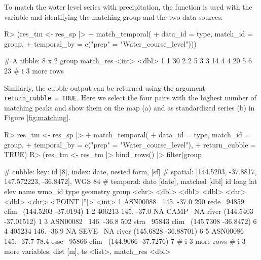 \documentclass[
  shortnames]{jss}
\begin{document}
To match the water level series with precipitation, the function  is used with the variable  and  identifying the matching group and the two data sources:

\begin{CodeChunk}
\begin{CodeInput}
R> (res_tm <- res_sp |> 
+   match_temporal(
+     data_id = type, match_id = group,
+     temporal_by = c("prcp" = "Water_course_level")))
\end{CodeInput}
\begin{CodeOutput}
# A tibble: 8 x 2
  group match_res
  <int>     <dbl>
1     1        30
2     2         5
3     3        14
4     4        20
5     6        23
# i 3 more rows
\end{CodeOutput}
\end{CodeChunk}

Similarly, the cubble output can be returned using the argument \texttt{return\_cubble\ =\ TRUE}. Here we select the four pairs with the highest number of matching peaks and show them on the map (a) and as standardized series (b) in Figure \ref{fig:matching}.

\begin{CodeChunk}
\begin{CodeInput}
R> res_tm <- res_sp |> 
+   match_temporal(
+     data_id = type, match_id = group,
+     temporal_by = c("prcp" = "Water_course_level"),
+     return_cubble = TRUE)
R> (res_tm <- res_tm |> bind_rows() |> filter(group %
\end{CodeInput}
\begin{CodeOutput}
# cubble:   key: id [8], index: date, nested form, [sf]
# spatial:  [144.5203, -37.8817, 147.572223, -36.8472], WGS 84
# temporal: date [date], matched [dbl]
  id         long   lat  elev name  wmo_id type              geometry group
  <chr>     <dbl> <dbl> <dbl> <chr>  <dbl> <chr>          <POINT [°]> <int>
1 ASN00088~  145. -37.0 290   rede~  94859 clim~  (144.5203 -37.0194)     1
2 406213     145. -37.0  NA   CAMP~     NA river (144.5403 -37.01512)     1
3 ASN00082~  146. -36.8 502   stra~  95843 clim~  (145.7308 -36.8472)     6
4 405234     146. -36.9  NA   SEVE~     NA river (145.6828 -36.88701)     6
5 ASN00086~  145. -37.7  78.4 esse~  95866 clim~  (144.9066 -37.7276)     7
# i 3 more rows
# i 3 more variables: dist [m], ts <list>, match_res <dbl>
\end{CodeOutput}
\end{CodeChunk}
\end{document}
